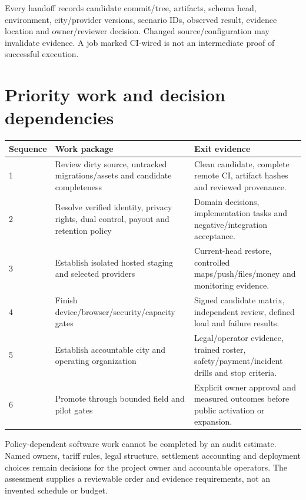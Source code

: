 \documentclass[11pt,a4paper]{article}
\begin{document}
Every handoff records candidate commit/tree, artifacts, schema head, environment,
city/provider versions, scenario IDs, observed result, evidence location and
owner/reviewer decision. Changed source/configuration may invalidate evidence.
A job marked CI-wired is not an intermediate proof of successful execution.

\section{Priority work and decision dependencies}
\begin{table}[H]\centering
\begin{tabular}{@{}p{}p{}p{}@{}}
\toprule Sequence & Work package & Exit evidence \\\midrule
1 & Review dirty source, untracked migrations/assets and candidate completeness & Clean candidate, complete remote CI, artifact hashes and reviewed provenance. \\
2 & Resolve verified identity, privacy rights, dual control, payout and retention policy & Domain decisions, implementation tasks and negative/integration acceptance. \\
3 & Establish isolated hosted staging and selected providers & Current-head restore, controlled maps/push/files/money and monitoring evidence. \\
4 & Finish device/browser/security/capacity gates & Signed candidate matrix, independent review, defined load and failure results. \\
5 & Establish accountable city and operating organization & Legal/operator evidence, trained roster, safety/payment/incident drills and stop criteria. \\
6 & Promote through bounded field and pilot gates & Explicit owner approval and measured outcomes before public activation or expansion. \\
\bottomrule
\end{tabular}
\end{table}
Policy-dependent software work cannot be completed by an audit estimate. Named
owners, tariff rules, legal structure, settlement accounting and deployment
choices remain decisions for the project owner and accountable operators.
The assessment supplies a reviewable order and evidence requirements, not an
invented schedule or budget.

\appendix
\clearpage
\end{document}
